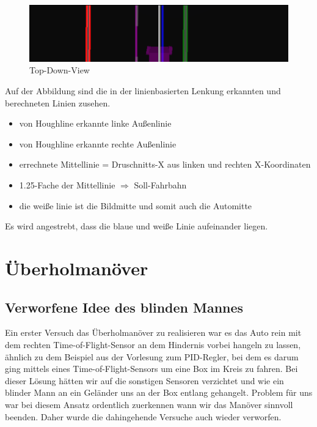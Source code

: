 \begin{figure}[H]
	\centering	
	\includegraphics[width=.8\textwidth]{img/topdown _view}
	\caption[Top-Down-View]{Top-Down-View}
	\label{fig:topdown _view}
\end{figure}

Auf der Abbildung sind die in der linienbasierten Lenkung erkannten und berechneten Linien zusehen.
\begin{itemize}
	\color{red} \item  von Houghline erkannte linke Außenlinie
	\color{green} \item  von Houghline erkannte rechte Außenlinie
	\color{violet} \item  errechnete Mittellinie = Druschnitts-X aus linken und rechten X-Koordinaten
	\color{blue} \item  1.25-Fache der Mittellinie $\Rightarrow$ Soll-Fahrbahn
	\color{gray} \item  die weiße linie ist die Bildmitte und somit auch die Automitte
\end{itemize}
Es wird angestrebt, dass die blaue und weiße Linie aufeinander liegen.

\newpage

\section{Überholmanöver}

\subsection{Verworfene Idee des \glqq blinden Mannes \glqq{}}
Ein erster Versuch das Überholmanöver zu realisieren war es das Auto rein mit dem rechten Time-of-Flight-Sensor an dem Hindernis vorbei hangeln zu lassen, ähnlich zu dem Beispiel aus der Vorlesung zum PID-Regler, bei dem es darum ging mittels eines Time-of-Flight-Sensors um eine Box im Kreis zu fahren. Bei dieser Lösung hätten wir auf die sonstigen Sensoren verzichtet und wie ein blinder Mann an ein Geländer uns an der Box entlang gehangelt. Problem für uns war bei diesem Ansatz ordentlich zuerkennen wann wir das Manöver sinnvoll beenden. Daher wurde die dahingehende Versuche auch wieder verworfen.


